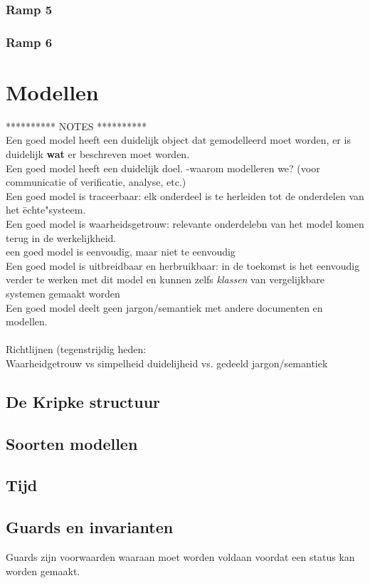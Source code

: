 \documentclass{article}%
\begin{document}
\subsubsection{Ramp 5}
\subsubsection{Ramp 6}

\section{Modellen}
********** NOTES **********\\
Een goed model heeft een duidelijk object dat gemodelleerd moet worden, er is duidelijk \textbf{wat} er beschreven moet worden.
\\
Een goed model heeft een duidelijk doel.
-waarom modelleren we? (voor communicatie of verificatie, analyse, etc.)
\\
Een goed model is traceerbaar: elk onderdeel is te herleiden tot de onderdelen van het ëchte"systeem.
\\
Een goed model is waarheidsgetrouw: relevante onderdelebn van het model komen terug in de werkelijkheid.
\\
een goed model is eenvoudig, maar niet te eenvoudig
\\
Een goed model is uitbreidbaar en herbruikbaar: in de toekomst is het eenvoudig verder te werken met dit model en kunnen zelfs \textit{klassen} van vergelijkbare  systemen gemaakt worden
\\
Een goed model deelt geen jargon/semantiek met andere documenten en modellen.
\\\\
Richtlijnen (tegenstrijdig heden:
\\
Waarheidgetrouw vs simpelheid
duidelijheid vs. gedeeld jargon/semantiek
\subsection{De Kripke structuur}

\subsection{Soorten modellen}

\subsection{Tijd}

\subsection{Guards en invarianten}
Guards zijn voorwaarden waaraan moet worden voldaan voordat een status kan worden gemaakt.
\end{document}
